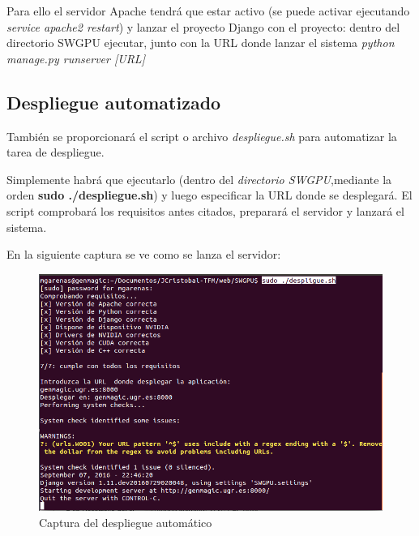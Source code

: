 Para ello el servidor Apache tendrá que estar activo (se puede activar ejecutando \textit{service apache2 restart}) y lanzar el proyecto Django con el proyecto: dentro del directorio SWGPU ejecutar, junto con la URL donde lanzar el sistema \textit{python manage.py runserver [URL]}


\subsection{Despliegue automatizado}
\bigskip
También se proporcionará el script o archivo \textit{despliegue.sh} para automatizar la tarea de despliegue.

Simplemente habrá que ejecutarlo (dentro del \textit{directorio SWGPU},mediante la orden \textbf{sudo ./despliegue.sh}) y luego especificar la URL donde se desplegará. El script comprobará los requisitos antes citados, preparará el servidor y lanzará el sistema.

En la siguiente captura se ve como se lanza el servidor:

\bigskip
\begin{figure}[h]
	\centering
	\includegraphics[width=1\linewidth]{../images/prueba_despliegue}
	\caption[Captura del despliegue automático]{Captura del despliegue automático}
	\label{fig:prueba_despliegue}
\end{figure}



